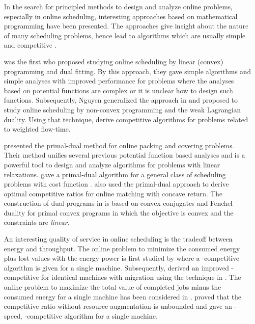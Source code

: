\documentclass[11pt]{article}
\begin{document}
In the search for principled methods to design and analyze online problems,
especially in online scheduling, interesting approaches 
\cite{AnandGarg12:Resource-augmentation,GuptaKrishnaswamy12:Online-Primal-Dual,Thang13:Lagrangian-Duality} 
based on mathematical programming have been presented. 
The approaches give insight about the nature of many scheduling problems,
hence lead to algorithms which are usually simple and competitive
\cite{AnandGarg12:Resource-augmentation,GuptaKrishnaswamy12:Online-Primal-Dual,Thang13:Lagrangian-Duality,DevanurHuang14:Primal-Dual,ImKulkarni14:Competitive-Algorithms,ImKulkarni14:SELFISHMIGRATE:-A-Scalable}.

\citet{AnandGarg12:Resource-augmentation} was the first who proposed 
studying online scheduling by linear (convex) 
programming and dual fitting. By this approach, they gave 
simple algorithms and simple analyses with improved performance
for problems where the analyses based on potential functions are complex or 
it is unclear how to design such functions. Subsequently, 
Nguyen \cite{Thang13:Lagrangian-Duality} generalized the approach
in \cite{AnandGarg12:Resource-augmentation} and proposed to study online scheduling 
by non-convex programming and the weak Lagrangian duality. Using that technique,
\cite{Thang13:Lagrangian-Duality} derive competitive algorithms 
for problems related to weighted flow-time.

\citet{BuchbinderNaor09:The-Design-of-Competitive}
presented the primal-dual method for online packing and covering problems.
Their method unifies several previous
potential function based analyses and is a powerful tool to design and analyze 
algorithms for problems with linear relaxations.
\citet{GuptaKrishnaswamy12:Online-Primal-Dual}
gave a primal-dual algorithm for a general class of scheduling problems with 
cost function . \citet{DevanurJain12:Online-matching}
also used the primal-dual approach to derive optimal competitive ratios for online
matching with concave return. 
The construction of dual programs in \cite{DevanurHuang14:Primal-Dual,DevanurJain12:Online-matching}
is based on convex conjugates and Fenchel duality for primal convex programs
in which the objective is convex and the constraints are \emph{linear}. 



An interesting quality of service in online scheduling is the tradeoff between 
energy and throughput. The online problem to minimize the consumed energy plus lost values 
with the energy power  is first studied by \cite{ChanLam10:Tradeoff-between}
where a -competitive algorithm is given for a single machine.
Subsequently, \citet{KlingPietrzyk13:Profitable-Scheduling} derived an 
improved -competitive for identical machines with migration using the technique in 
\cite{GuptaKrishnaswamy12:Online-Primal-Dual}. 
The online problem to maximize the total value of completed jobs minus the consumed energy
for a single machine has been considered in
\cite{PruhsStein10:How-to-Schedule-When}. \citet{PruhsStein10:How-to-Schedule-When} proved that 
the competitive ratio without resource augmentation is unbounded and gave 
an -speed, -competitive algorithm for a single machine.
 
\end{document}
